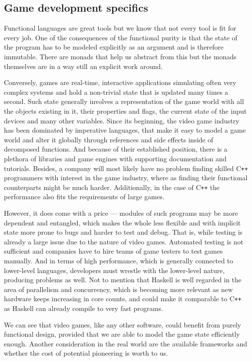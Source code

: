\documentclass[
  digital, %
  color,   %
  table,   %
  oneside, %
  lof,     %
  lot,     %
]{fithesis3}
\newcommand{\cpp}{C\nolinebreak\texttt{+}\nolinebreak\texttt{+}}
\begin{document}
\subsection{Game development specifics}
Functional languages are great tools but we know that not every tool is
fit for every job. One of the consequences of the functional purity is
that the state of the program has to be modeled explicitly as an argument
and is therefore immutable. There are monads that help us abstract
from this but the monads themselves are in a way still an explicit work around.

Conversely, games are real-time, interactive applications simulating
often very complex systems and hold a non-trivial state that is
updated many times a second. Such state generally involves a representation
of the game world with all the objects existing in it, their properties and flags,
the current state of the input devices and many other variables. Since its beginning,
the video game industry has been dominated by imperative languages,
that make it easy to model a game world and alter it globally through
references and side effects inside of decomposed functions. And because
of their established position, there is a plethora of libraries and game engines
with supporting documentation and tutorials. Besides, a company will most likely
have no problem finding skilled \cpp{} programmers with interest
in the game industry, where as finding their functional counterparts
might be much harder. Additionally, in the case of \cpp{} the performance
also fits the requirements of large games.

However, it does come with a price --- modules of such programs may be
more dependent and entangled, which makes the whole less flexible and with
implicit state more prone to bugs and harder to test and debug.
That is, while testing is already a large issue due to the nature of video games.
Automated testing is not sufficient and companies have to hire teams
of game testers to test games manually. And in terms of high performance,
which is generally connected to lower-level languages, developers must
wrestle with the lower-level nature, producing problems as well. Not to mention
that Haskell is well regarded in the area of parallelism and concurrency,
which is becoming more relevant as new hardware keeps increasing in core counts,
and could make it comparable to \cpp{} as Haskell can already compile to very fast programs.

We can see that video games, like any other software, could benefit from
purely functional design, provided that we are able to model the
game state efficiently enough. Another consideration in the real world
are the available frameworks and whether the cost of potential
pioneering is worth to us.
\end{document}
